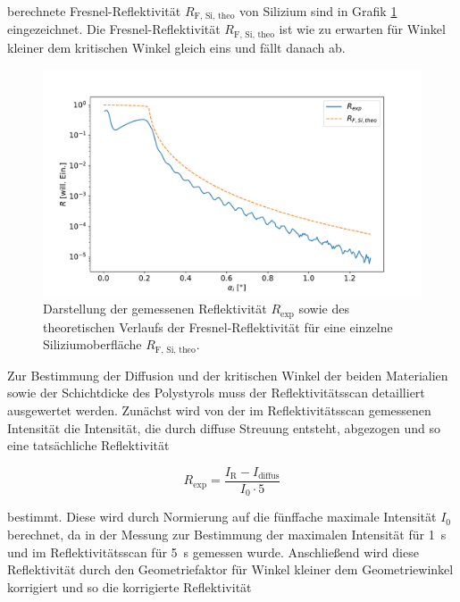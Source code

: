     berechnete Fresnel-Reflektivität $R_{\text{F, Si, theo}}$ von Silizium sind in Grafik \ref{fig:Reflektivität_exp} eingezeichnet. Die Fresnel-Reflektivität $R_{\text{F, Si, theo}}$ ist wie zu erwarten für 
    Winkel kleiner dem kritischen Winkel gleich eins und fällt danach ab.

    \FloatBarrier
    \begin{figure}[h]
        \centering
        \includegraphics[width = \textwidth]{reflectivity_exp.pdf}
        \caption{Darstellung der gemessenen Reflektivität $R_{\text{exp}}$ sowie des theoretischen Verlaufs der Fresnel-Reflektivität für eine einzelne Siliziumoberfläche $R_{\text{F, Si, theo}}$.}
        \label{fig:Reflektivität_exp}
      \end{figure}
   
    \FloatBarrier

    Zur Bestimmung der Diffusion und der kritischen Winkel der beiden Materialien sowie der Schichtdicke des Polystyrols muss der Reflektivitätsscan detailliert ausgewertet werden. Zunächst wird von der im 
    Reflektivitätsscan gemessenen Intensität die Intensität, die durch diffuse Streuung entsteht, abgezogen und so eine tatsächliche Reflektivität 
    
    \begin{equation*}
      R_{\text{exp}} = \frac{I_{\text{R}} - I_{\text{diffus}}}{I_0 \cdot 5}
    \end{equation*}
    
    bestimmt. Diese wird durch Normierung auf die fünffache maximale Intensität $I_0$ berechnet, da in der Messung zur Bestimmung der maximalen Intensität für \SI{1}{\second} und im Reflektivitätsscan für
    \SI{5}{\second} gemessen wurde. Anschließend wird diese Reflektivität durch den Geometriefaktor für Winkel kleiner dem Geometriewinkel korrigiert und so die korrigierte Reflektivität

